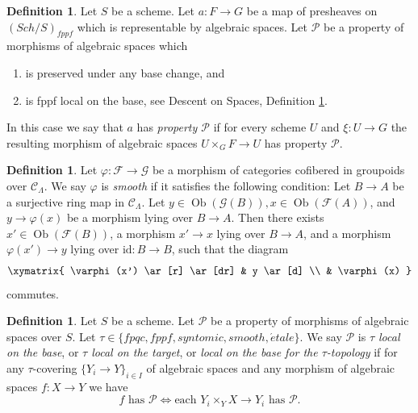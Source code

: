 \documentclass{amsart}
\theoremstyle{plain}
\theoremstyle{definition}
\newtheorem{definition}[subsection]{Definition}
\theoremstyle{remark}
\numberwithin{equation}{subsection}
\def\Sch{\mathit{Sch}}
\def\Ob{\mathop{\mathrm{Ob}}\nolimits}
\def\etale{{\acute{e}tale}}
\begin{document}
\begin{definition}
\label{bootstrap-definition-property-transformation}
Let $S$ be a scheme. Let $a : F \to G$ be a map of presheaves on
$(\Sch/S)_{fppf}$ which is representable by algebraic spaces.
Let $\mathcal{P}$ be a property of morphisms of algebraic spaces which
\begin{enumerate}
\item is preserved under any base change, and
\item is fppf local on the base, see
Descent on Spaces,
Definition \ref{spaces-descent-definition-property-morphisms-local}.
\end{enumerate}
In this case we say that $a$ has {\it property $\mathcal{P}$} if for every
scheme $U$ and $\xi : U \to G$ the resulting morphism of algebraic spaces
$U \times_G F \to U$ has property $\mathcal{P}$.
\end{definition}

\begin{definition}
\label{formal-defos-definition-smooth-morphism}
Let $\varphi : \mathcal{F} \to \mathcal{G}$ be a morphism of categories
cofibered in groupoids over $\mathcal{C}_\Lambda$.  We say  $\varphi$ is
{\it smooth} if it satisfies the following condition: Let $B \to A$ be
a surjective ring map in $\mathcal{C}_\Lambda$.  Let $y \in
\Ob(\mathcal{G}(B)), x \in \Ob(\mathcal{F}(A))$, and $y
\to \varphi(x)$ be a morphism lying over $B \to A$.  Then there
exists $x' \in \Ob(\mathcal{F}(B))$, a morphism $x' \to x$
lying over $B \to A$, and a morphism $\varphi(x') \to y$ lying
over $\text{id}: B \to B$, such that the diagram
$$
\xymatrix{
\varphi(x') \ar[r] \ar[dr] & y \ar[d] \\
& \varphi(x)
}
$$
commutes.
\end{definition}

\begin{definition}
\label{spaces-descent-definition-property-morphisms-local}
Let $S$ be a scheme.
Let $\mathcal{P}$ be a property of morphisms of algebraic spaces over $S$.
Let $\tau \in \{fpqc, fppf, syntomic, smooth, \etale\}$.
We say $\mathcal{P}$ is {\it $\tau$ local on the base}, or
{\it $\tau$ local on the target}, or
{\it local on the base for the $\tau$-topology} if for any
$\tau$-covering $\{Y_i \to Y\}_{i \in I}$ of algebraic spaces
and any morphism of algebraic spaces $f : X \to Y$ we
have
$$
f \text{ has }\mathcal{P}
\Leftrightarrow
\text{each }Y_i \times_Y X \to Y_i\text{ has }\mathcal{P}.
$$
\end{definition}
\end{document}
